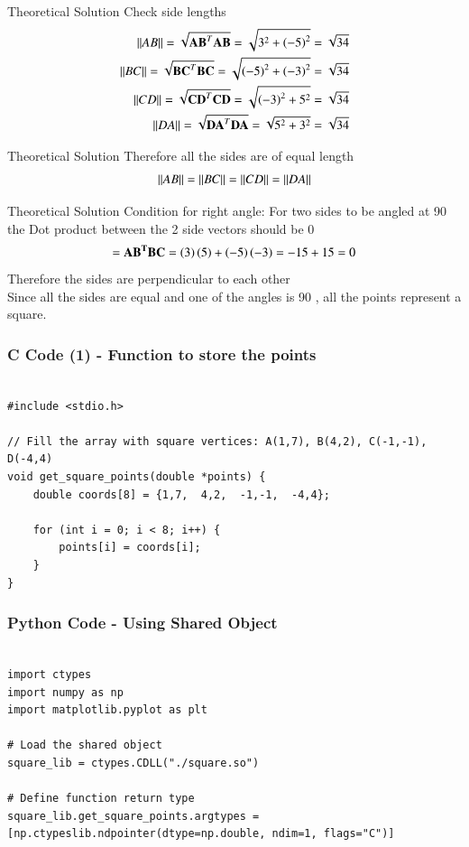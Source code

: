 \documentclass{beamer}
\begin{document}
\begin{frame}{Theoretical Solution}
Check side lengths
\begin{align}
    \left\lVert AB\right\rVert=\sqrt{\mathbf{AB}^T\mathbf{AB}}=\sqrt{3^2+\left(-5\right)^2}=\sqrt{34}\\
    \left\lVert BC\right\rVert=\sqrt{\mathbf{BC}^T\mathbf{BC}}=\sqrt{\left(-5\right)^2+\left(-3\right)^2}=\sqrt{34}\\
    \left\lVert CD\right\rVert=\sqrt{\mathbf{CD}^T\mathbf{CD}}=\sqrt{\left(-3\right)^2+5^2}=\sqrt{34}\\
    \left\lVert DA\right\rVert=\sqrt{\mathbf{DA}^T\mathbf{DA}}=\sqrt{5^2+3^2}=\sqrt{34}
\end{align}
\end{frame}
\begin{frame}{Theoretical Solution}
Therefore all the sides are of equal length
\begin{align}
    \left\lVert AB\right\rVert=\left\lVert BC\right\rVert=\left\lVert CD\right\rVert=\left\lVert DA\right\rVert
\end{align}
\end{frame}
\begin{frame}{Theoretical Solution}
Condition for right angle:
For two sides to be angled at 90 the Dot product between the 2 side vectors should be 0
\begin{align}
    =\mathbf{AB^TBC}=\left(3\right)\left(5\right)+\left(-5\right)\left(-3\right)=-15+15=0
\end{align}
Therefore the sides are perpendicular to each other\\
Since all the sides are equal and one of the angles is 90 , all the points represent a square.
\end{frame}

\begin{frame}[fragile]
    \frametitle{C Code (1) - Function to store the points }

    \begin{lstlisting}

#include <stdio.h>

// Fill the array with square vertices: A(1,7), B(4,2), C(-1,-1), D(-4,4)
void get_square_points(double *points) {
    double coords[8] = {1,7,  4,2,  -1,-1,  -4,4};

    for (int i = 0; i < 8; i++) {
        points[i] = coords[i];
    }
}

    \end{lstlisting}
\end{frame}


\begin{frame}[fragile]
    \frametitle{Python Code - Using Shared Object}
    \begin{lstlisting}

import ctypes
import numpy as np
import matplotlib.pyplot as plt

# Load the shared object
square_lib = ctypes.CDLL("./square.so")

# Define function return type
square_lib.get_square_points.argtypes = [np.ctypeslib.ndpointer(dtype=np.double, ndim=1, flags="C")]


\end{lstlisting}
\end{frame}
\end{document}
